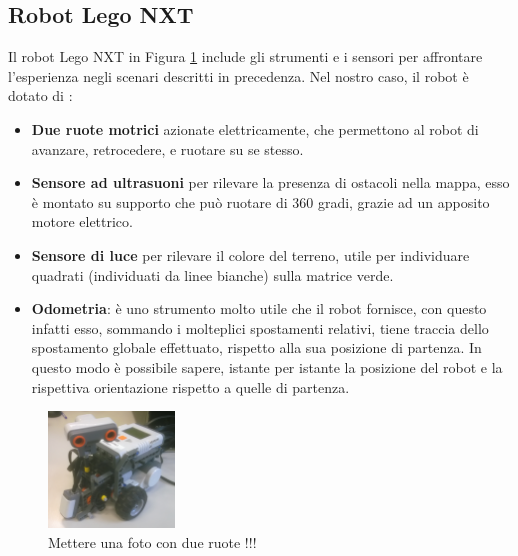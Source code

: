 \documentclass[english]{article}
\begin{document}
\subsection{Robot Lego NXT}
Il robot Lego NXT in Figura \ref{fig: nxt} include gli strumenti e i sensori per affrontare l'esperienza negli scenari descritti in precedenza. Nel nostro caso, il robot è dotato di :
\begin{itemize}
\item \textbf{Due ruote motrici} azionate elettricamente, che permettono al robot di avanzare, retrocedere, e ruotare su se stesso.
\item \textbf{Sensore ad ultrasuoni} per rilevare la presenza di ostacoli nella mappa, esso è montato su supporto che può ruotare di 360 gradi, grazie ad un apposito motore elettrico.
\item \textbf{Sensore di luce} per rilevare il colore del terreno, utile per individuare quadrati (individuati da linee bianche) sulla matrice verde.
\item \textbf{Odometria}: è uno strumento molto utile che il robot fornisce, con questo infatti esso, sommando i molteplici spostamenti relativi, tiene traccia dello spostamento globale effettuato, rispetto alla sua posizione di partenza. In questo modo è possibile sapere, istante per istante la posizione del robot e la rispettiva orientazione rispetto a quelle di partenza.
\end{itemize}
\begin{figure}[!h]
\centering
\includegraphics[width=0.3\textwidth]{nxt}
\caption{Mettere una foto con due ruote !!!}
\label{fig: nxt}
\end{figure}
\end{document}

